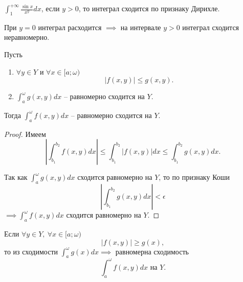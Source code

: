 \begin{example}
    $\int_{1}^{+\infty}\frac{\sin x}{x^y}dx$, если $y > 0$, то интеграл сходится по признаку Дирихле.

    При $y = 0$ интеграл расходится $\implies$ на интервале $y > 0$ интеграл сходится неравномерно.
\end{example}

\begin{theorem}
    Пусть \begin{enumerate}
        \item $\forall y \in Y$ и $\forall x \in [a;\omega)$
              \[
                  \big|f(x,y)\big| \leqslant g(x,y).
              \]
        \item $\int_{a}^{\omega}g(x,y)dx$ -- равномерно сходится на $Y$.
    \end{enumerate}

    Тогда $\int_{a}^{\omega}f(x,y)dx$ -- равномерно сходится на $Y$.
\end{theorem}

\begin{proof}
    Имеем
    \[
        \left|\int_{b_1}^{b_2}f(x,y)dx\right| \leqslant \int_{b_1}^{b_2}\left|f(x,y)\right|dx \leqslant \int_{b_1}^{b_2}g(x,y)dx.
    \]

    Так как $\int_{a}^{\omega}g(x,y)dx$ сходится равномерно на $Y$, то по признаку Коши
    \[
        \left|\int_{b_1}^{b_2}g(x,y)dx\right| < \epsilon
    \]
    $\implies \int_{a}^{\omega}f(x,y)dx$ сходится равномерно на $Y$.
\end{proof}

\begin{corollary}
    Если $\forall y \in Y, \ \forall x \in [a;\omega)$
    \[
        \big|f(x,y)\big| \geqslant g(x),
    \]
    то из сходимости $\int_{a}^{\omega}g(x)dx \implies$ равномерна сходимость
    \[
        \int_{a}^{\omega}f(x,y)dx \text{ на }Y.
    \]
\end{corollary}

